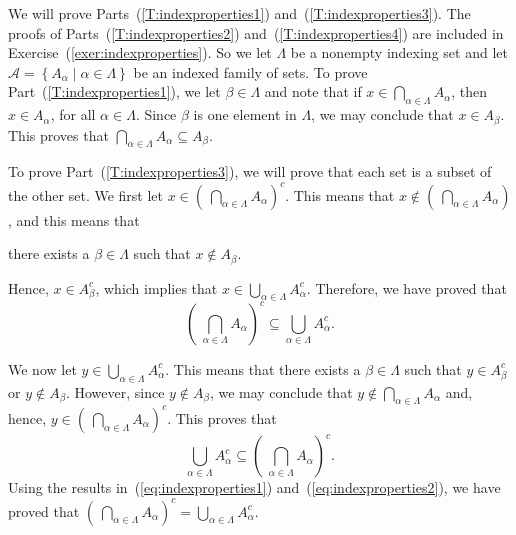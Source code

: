 \setcounter{equation}{0}
\begin{myproof}
We will prove Parts~(\ref{T:indexproperties1}) and~(\ref{T:indexproperties3}).  The proofs of Parts~(\ref{T:indexproperties2}) and~(\ref{T:indexproperties4}) are included in  
Exercise~(\ref{exer:indexproperties}).  So we let $\Lambda$ be a nonempty indexing set and let 
$\mathscr{A} = \left\{ A_\alpha \mid \alpha \in \Lambda \right\}$ be an indexed family of sets.  To prove Part~(\ref{T:indexproperties1}), we let $\beta \in \Lambda$ and note that if 
$x \in \bigcap\limits_{\alpha \in \Lambda}^{}A_\alpha$, then $x \in A_\alpha$, for all 
$\alpha \in \Lambda$.  Since $\beta$ is one element in $\Lambda$, we may conclude that 
$x \in A_\beta$.  This proves that 
$\bigcap\limits_{\alpha \in \Lambda}^{}A_\alpha \subseteq A_\beta$.

To prove Part~(\ref{T:indexproperties3}), we will prove that each set is a subset of the other set.  We first let $x \in \left(\:\bigcap\limits_{\alpha \in \Lambda}^{}A_\alpha \right)^c$.  This means that $x \notin \left(\:\bigcap\limits_{\alpha \in \Lambda}^{}A_\alpha \right)$, and this means that \pagebreak
\begin{center}
there exists a $\beta \in \Lambda$ such that $x \notin A_\beta$.
\end{center}
Hence, $x \in A_{\beta}^c$,  which implies that 
$x \in \bigcup\limits_{\alpha \in \Lambda}^{}A_{\alpha}^c$.  Therefore, we have proved that 
\begin{equation} \label{eq:indexproperties1}
\left(\:\bigcap_{\alpha \in \Lambda}^{}A_\alpha \right)^c \subseteq 
\bigcup_{\alpha \in \Lambda}^{}A_{\alpha}^c.
\end{equation}

We now let $y \in \bigcup\limits_{\alpha \in \Lambda}^{}A_{\alpha}^c$.  This means that there exists a $\beta \in \Lambda$ such that $y \in A_{\beta}^c$ or $y \notin A_\beta$.  However, since 
$y \notin A_\beta$, we may conclude that $y \notin \bigcap\limits_{\alpha \in \Lambda}^{}A_\alpha$ and, hence, $y \in \left(\:\bigcap\limits_{\alpha \in \Lambda}^{}A_\alpha \right)^c$.  This proves that
\begin{equation} \label{eq:indexproperties2}
\bigcup_{\alpha \in \Lambda}^{}A_{\alpha}^c \subseteq 
\left(\:\bigcap_{\alpha \in \Lambda}^{}A_\alpha \right)^c.
\end{equation}
Using the results in~(\ref{eq:indexproperties1}) and~(\ref{eq:indexproperties2}), we have proved that $\left(\:\bigcap\limits_{\alpha \in \Lambda}^{}A_\alpha \right)^c = 
\bigcup\limits_{\alpha \in \Lambda}^{}A_{\alpha}^c$.
\end{myproof}

